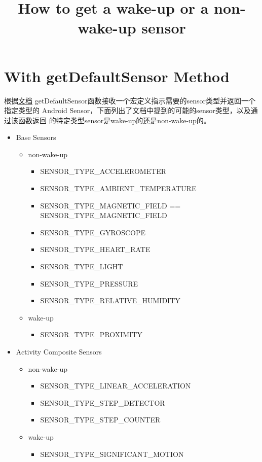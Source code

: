 \documentclass{article}
\title{How to get a wake-up or a non-wake-up sensor}
\begin{document}
\section{With getDefaultSensor Method}
根据\href{https://source.android.com/devices/sensors/sensor-types.html}{文档}
getDefaultSensor函数接收一个宏定义指示需要的sensor类型并返回一个指定类型的
Android Sensor，下面列出了文档中提到的可能的sensor类型，以及通过该函数返回
的特定类型sensor是wake-up的还是non-wake-up的。
\begin{itemize}
  \item Base Sensors
    \begin{itemize}
    \item non-wake-up
      \begin{itemize}
        \item SENSOR\_TYPE\_ACCELEROMETER
        \item SENSOR\_TYPE\_AMBIENT\_TEMPERATURE
        \item SENSOR\_TYPE\_MAGNETIC\_FIELD == SENSOR\_TYPE\_MAGNETIC\_FIELD
        \item SENSOR\_TYPE\_GYROSCOPE
        \item SENSOR\_TYPE\_HEART\_RATE
        \item SENSOR\_TYPE\_LIGHT
        \item SENSOR\_TYPE\_PRESSURE
        \item SENSOR\_TYPE\_RELATIVE\_HUMIDITY
      \end{itemize}
    \item wake-up
      \begin{itemize}
        \item SENSOR\_TYPE\_PROXIMITY
      \end{itemize}
    \end{itemize}
  \item Activity Composite Sensors
    \begin{itemize}
    \item non-wake-up
      \begin{itemize}
      \item SENSOR\_TYPE\_LINEAR\_ACCELERATION
      \item SENSOR\_TYPE\_STEP\_DETECTOR
      \item SENSOR\_TYPE\_STEP\_COUNTER
      \end{itemize}
    \item wake-up
      \begin{itemize}
      \item SENSOR\_TYPE\_SIGNIFICANT\_MOTION

\end{itemize}
\end{itemize}
\end{itemize}
\end{document}
